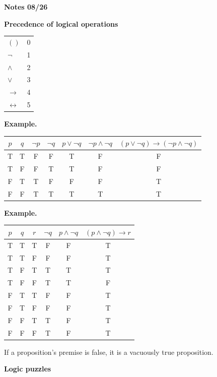 \documentclass{article}
\begin{document}
\textbf{Notes 08/26}

\textbf{Precedence of logical operations}

\medskip

\begin{tabular}{ll}
$()$ & 0 \\
$\lnot$ & 1 \\
$\land$ & 2 \\
$\lor$ & 3 \\
$\to$ & 4 \\
$\leftrightarrow$ & 5
\end{tabular}

\bigskip

\textbf{Example.}

\medskip

\begin{tabular}{cc|cc|c|c|c}
$p$ & $q$ & $\lnot p$ & $\lnot q$ & $p \lor \lnot q$ & $\lnot p \land \lnot q$ & $(p \lor \lnot q) \to (\lnot p \land \lnot q)$ \\
\hline
T & T & F & F & T & F & F \\
T & F & F & T & T & F & F \\
F & T & T & F & F & F & T \\
F & F & T & T & T & T & T
\end{tabular}

\bigskip

\textbf{Example.}

\medskip

\begin{tabular}{ccc|c|c|c}
$p$ & $q$ & $r$ & $\lnot q$ & $p \land \lnot q$ & $(p \land \lnot q) \to r$ \\
\hline
T & T & T & F & F & T \\
T & T & F & F & F & T \\
T & F & T & T & T & T \\
T & F & F & T & T & F \\
F & T & T & F & F & T \\
F & T & F & F & F & T \\
F & F & T & T & F & T \\
F & F & F & T & F & T
\end{tabular}

\bigskip

If a proposition's premise is false, it is a vacuously true proposition.

\bigskip

\textbf{Logic puzzles}

\medskip
\end{document}
